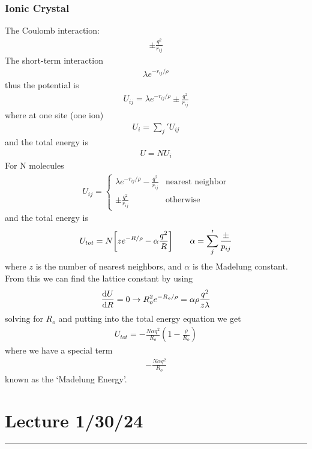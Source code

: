 \documentclass[../main.tex]{subfiles}
\begin{document}
\subsubsection*{Ionic Crystal}

The Coulomb interaction: 
\begin{align*}
    \pm \frac{q^2}{r_{ij}}
\end{align*}
The short-term interaction 
\begin{align*}
    \lambda e^{-r_{ij}/\rho}
\end{align*}
thus the potential is
\begin{align*}
    U_{ij} = \lambda e^{-r_{ij}/\rho} \pm \frac{q^2}{r_{ij}}
\end{align*}
where at one site (one ion)
\begin{align*}
    U_i = \sum_j' U_{ij}
\end{align*}
and the total energy is
\begin{align*}
    U = N U_i
\end{align*}
For N molecules
\begin{align*}
    U_{ij} = \begin{cases}
        \lambda e^{-r_{ij}/\rho} - \frac{q^2}{r_{ij}} & \text{nearest neighbor} \\
        \pm \frac{q^2}{r_{ij}} & \text{otherwise}
    \end{cases}
\end{align*}
and the total energy is
\begin{align*}
    U_{tot} = N \qt[z e^{-R/\rho} - \alpha \frac{q^2}{R}] \qquad \alpha = \sum_j' \frac{\pm}{p_{ij}}
\end{align*}
where $z$ is the number of nearest neighbors, and $\alpha$ is the Madelung constant. From this we
can find the lattice constant by using
\begin{align*}
    \dv{U}{R} = 0 \rightarrow R_o^2 e^{-R_o/\rho} = \alpha \rho \frac{q^2}{z\lambda}
\end{align*}
solving for $R_o$ and putting into the total energy equation we get
\begin{align*}
    U_{tot} = -\frac{N\alpha q^2}{R_o} (1 - \frac{\rho}{R_o}) 
\end{align*}
where we have a special term
\begin{align*}
    -\frac{N\alpha q^2}{R_o}
\end{align*}
known as the `Madelung Energy'.

\pagebreak
\section{Lecture 1/30/24}
\hrule \vspace{10px}
\end{document}
